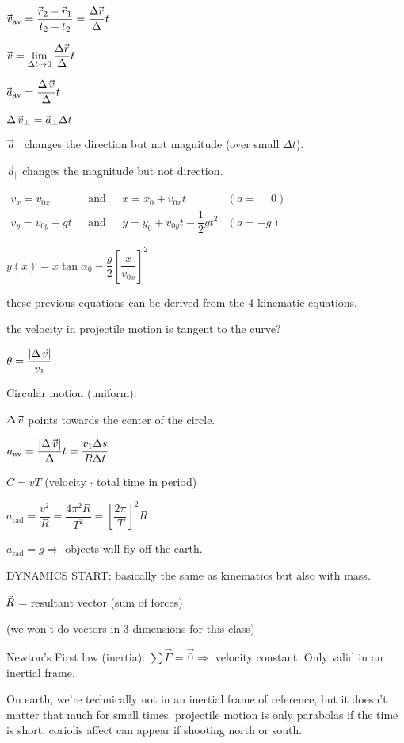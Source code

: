 \documentclass[12pt]{article}
\newcommand \dstyle \displaystyle
\newcommand \hpx [1]{\hspace{#1px}}
\newcommand \nhpx [1]{\hspace{-#1px}}
\newcommand \bgrp [1]{\left[ #1 \right]}   %
\newcommand \av {\mathrm{av}}
\newcommand \rad {\mathrm{rad}}
\newcommand \avec {\!\vec{\,a}}
\newcommand \Fvec {\vec F}
\newcommand \rvec {\nhpx 1 \vec{\hpx 1 r}}
\newcommand \Rvec {\!\vec{\hpx{0.5}R}}
\newcommand \vvec {\nhpx 1 \vec{\hpx 1 v}}
\newcommand \Df [1]{\Delta #1}
\newcommand \Dt {\Df t}
\begin{document}
$\vvec_\av = \dfrac{\rvec_2 - \rvec_1}{t_2 - t_2} = \dfrac{\Df\rvec}\Dt$

$\dstyle\vvec = \lim_{\Dt \to 0}\dfrac{\Df\rvec}\Dt$

$\avec_\av = \dfrac{\Df\,\vvec}\Dt$

$\Df\,\vvec_\perp = \avec_\perp \Dt$ 

$\avec_\perp$ changes the direction but not magnitude (over small $\Dt$).

$\avec_\parallel$ changes the magnitude but not direction.

$\begin{array}{llll}
	v_x = v_{0x}      & ~~~ \text{and} ~~~ & x = x_0 + v_{0x}t                & (a = \phantom-0) \\
	v_y = v_{0y} - gt & ~~~ \text{and} ~~~ & y = y_0 + v_{0y}t - \dfrac12gt^2 & (a = -g)
\end{array}$

$y(x) = x\tan\alpha_0 - \dfrac g2 \bgrp{\dfrac x{v_{0x}}}^2$

these previous equations can be derived from the 4 kinematic equations.

the velocity in projectile motion is tangent to the curve?

$\theta = \dfrac{|\Df\,\vvec|}{v_1}$.

Circular motion (uniform):

$\Df\,\vvec$ points towards the center of the circle.

$a_\av = \dfrac{|\Df\,\vvec|}\Dt = \dfrac{v_1\Df s}{R\Dt}$

$C = vT$ (velocity $\cdot$ total time in period)

$a_\rad = \dfrac{v^2}R = \dfrac{4\pi^2R}{T^2} = \bgrp{\dfrac{2\pi}T}^2\!R$

$a_\rad = g \Longrightarrow $ objects will fly off the earth.

DYNAMICS START: basically the same as kinematics but also with mass.

$\Rvec$ = resultant vector (sum of forces)

(we won't do vectors in 3 dimensions for this class)

Newton's First law (inertia): $\sum \Fvec = \vec 0 \Longrightarrow $ velocity constant.
Only valid in an inertial frame.

On earth, we're technically not in an inertial frame of reference, but it doesn't matter that much for small times. projectile motion is only parabolas if the time is short. coriolis affect can appear if shooting north or south.
\end{document}
